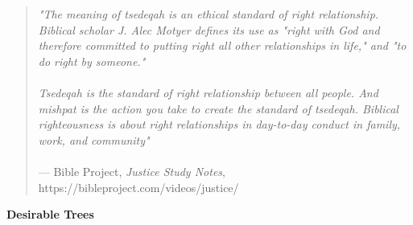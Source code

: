 \documentclass[11pt]{article}
\begin{document}
\begin{quote}
\textit{"The meaning of tsedeqah is an ethical standard of right relationship. Biblical scholar J. Alec
Motyer defines its use as "right with God and therefore committed to putting right all other relationships in life," and "to do right by someone."
\\\\Tsedeqah is the standard of right relationship between all people. And mishpat is the action you
take to create the standard of tsedeqah. Biblical righteousness is about right relationships in
day-to-day conduct in family, work, and community"}\\\\
\hfill --- Bible Project, \textit{Justice Study Notes}, https://bibleproject.com/videos/justice/
\end{quote}

\begin{chiasticoutline}[Isaiah 1:27-31]{.25em}{2em}





\end{chiasticoutline}
\newpage
{\vspace{2em}}
{\large\bfseries Desirable Trees}
{\vspace{1em}}
\end{document}

